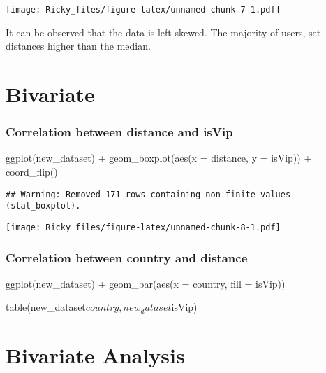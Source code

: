 \documentclass[
]{article}
\newenvironment{Shaded}{\begin{snugshade}}{\end{snugshade}}
\newcommand{\AttributeTok}[1]{\textcolor[rgb]{0.77,0.63,0.00}{#1}}
\newcommand{\FunctionTok}[1]{\textcolor[rgb]{0.00,0.00,0.00}{#1}}
\newcommand{\NormalTok}[1]{#1}
\newcommand{\SpecialCharTok}[1]{\textcolor[rgb]{0.00,0.00,0.00}{#1}}
\begin{document}
\texttt{[image: Ricky\_files/figure-latex/unnamed-chunk-7-1.pdf]}

It can be observed that the data is left skewed. The majority of users,
set distances higher than the median.

\hypertarget{bivariate}{%
\section{Bivariate}\label{bivariate}}

\hypertarget{correlation-between-distance-and-isvip}{%
\subsubsection{Correlation between distance and
isVip}\label{correlation-between-distance-and-isvip}}

\begin{Shaded}
\begin{Highlighting}[]
\FunctionTok{ggplot}\NormalTok{(new\_dataset) }\SpecialCharTok{+}
  \FunctionTok{geom\_boxplot}\NormalTok{(}\FunctionTok{aes}\NormalTok{(}\AttributeTok{x =}\NormalTok{ distance, }\AttributeTok{y =}\NormalTok{ isVip)) }\SpecialCharTok{+} \FunctionTok{coord\_flip}\NormalTok{()}
\end{Highlighting}
\end{Shaded}

\begin{verbatim}
## Warning: Removed 171 rows containing non-finite values (stat_boxplot).
\end{verbatim}

\texttt{[image: Ricky\_files/figure-latex/unnamed-chunk-8-1.pdf]}

\hypertarget{correlation-between-country-and-distance}{%
\subsubsection{Correlation between country and
distance}\label{correlation-between-country-and-distance}}

ggplot(new\_dataset) + geom\_bar(aes(x = country, fill = isVip))

table(new\_dataset\(country, new_dataset\)isVip)

\hypertarget{bivariate-analysis}{%
\section{Bivariate Analysis}\label{bivariate-analysis}}
\end{document}
